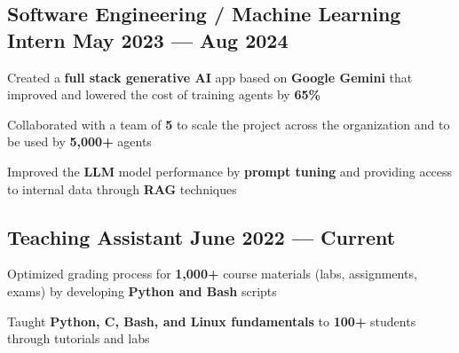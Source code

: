 
\subsection{{Software Engineering / Machine Learning Intern \hfill May 2023 --- Aug 2024}}
\begin{zitemize}
    \item Created a \textbf{full stack generative AI} app based on \textbf{Google Gemini} that improved and lowered the cost of training agents by \textbf{65\%}
    \item Collaborated with a team of \textbf{5} to scale the project across the organization and to be used by \textbf{5,000+} agents
    \item Improved the \textbf{LLM} model performance by \textbf{prompt tuning} and providing access to internal data through \textbf{RAG} techniques
\end{zitemize}


\vspace{0.3cm}\subsection{{Teaching Assistant \hfill June 2022 --- Current}}
\begin{zitemize}
    \item Optimized grading process for \textbf{1,000+} course materials (labs, assignments, exams) by developing \textbf{Python and Bash} scripts
    \item Taught \textbf{Python, C, Bash, and Linux fundamentals} to \textbf{100+} students through tutorials and labs
\end{zitemize}

